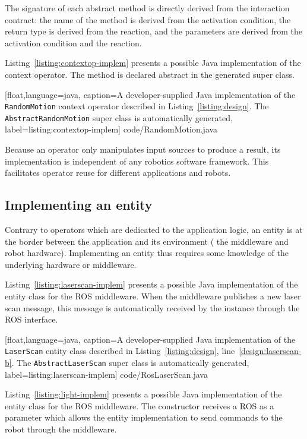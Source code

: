 The signature of each abstract method is directly derived from the
interaction contract: the name of the method is derived from the
activation condition, the return type is derived from the reaction,
and the parameters are derived from the activation condition and the
reaction.

Listing~\ref{listing:contextop-implem} presents a possible Java
implementation of the  context operator. The
 method is declared abstract in the
 generated super class.

%
[float,language=java,%
caption={A developer-supplied Java implementation of the
  \texttt{Random\-Motion} context operator described in
  Listing~\ref{listing:design}. The \texttt{Abstract\-Random\-Motion}
  super class is automatically generated},%
label={listing:contextop-implem}]%
{code/RandomMotion.java}

Because an operator only manipulates input sources to produce a
result, its implementation is independent of any robotics software
framework. This facilitates operator reuse for different applications
and robots.

\subsection{Implementing an entity}

Contrary to operators which are dedicated to the application logic, an
entity is at the border between the application and its environment
(\eg{} the middleware and robot hardware). Implementing an entity thus
requires some knowledge of the underlying hardware or middleware.

Listing~\ref{listing:laserscan-implem} presents a possible Java
implementation of the  entity class for the ROS
middleware. When the middleware publishes a new laser scan message,
this message is automatically received by the 
instance through the ROS  interface.

%
[float,language=java,%
caption={A developer-supplied Java implementation of the
  \texttt{LaserScan} entity class described in
  Listing~\ref{listing:design}, line~\ref{design:laserscan-b}. The
  \texttt{Abstract\-Laser\-Scan} super class is automatically
  generated},%
label={listing:laserscan-implem}]%
{code/RosLaserScan.java}

Listing~\ref{listing:light-implem} presents a possible Java
implementation of the  entity class for the ROS middleware.
The constructor receives a ROS  as a parameter which
allows the entity implementation to send commands to the robot through
the middleware.

